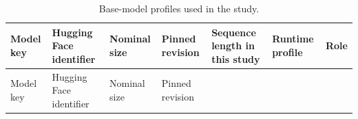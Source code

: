 \begin{landscape}
\begingroup\scriptsize\setlength{\tabcolsep}{1pt}\sloppy
\begin{longtable}[]{@{}
  >{\raggedright\arraybackslash}p{}
  >{\raggedright\arraybackslash}p{}
  >{\raggedleft\arraybackslash}p{}
  >{\raggedright\arraybackslash}p{}
  >{\raggedleft\arraybackslash}p{}
  >{\raggedright\arraybackslash}p{}
  >{\raggedright\arraybackslash}p{}@{}}
\caption{Base-model profiles used in the study.}\tabularnewline
\toprule\noalign{}
\begin{minipage}[b]{\linewidth}\raggedright
Model key
\end{minipage} & \begin{minipage}[b]{\linewidth}\raggedright
Hugging Face identifier
\end{minipage} & \begin{minipage}[b]{\linewidth}\raggedleft
Nominal size
\end{minipage} & \begin{minipage}[b]{\linewidth}\raggedright
Pinned revision
\end{minipage} & \begin{minipage}[b]{\linewidth}\raggedleft
Sequence length in this study
\end{minipage} & \begin{minipage}[b]{\linewidth}\raggedright
Runtime profile
\end{minipage} & \begin{minipage}[b]{\linewidth}\raggedright
Role
\end{minipage} \\
\midrule\noalign{}
\endfirsthead
\toprule\noalign{}
\begin{minipage}[b]{\linewidth}\raggedright
Model key
\end{minipage} & \begin{minipage}[b]{\linewidth}\raggedright
Hugging Face identifier
\end{minipage} & \begin{minipage}[b]{\linewidth}\raggedleft
Nominal size
\end{minipage} & \begin{minipage}[b]{\linewidth}\raggedright
Pinned revision
\end{minipage} & \begin{minipage}[b]{\linewidth}\raggedleft

\end{minipage}
\end{longtable}
\end{landscape}
